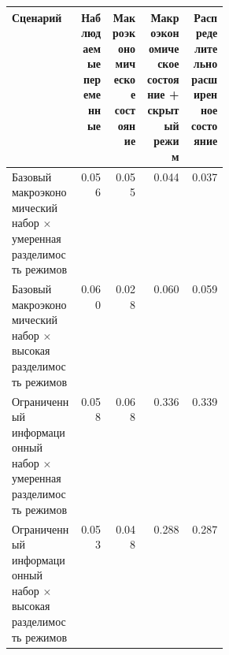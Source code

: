 \begin{tabular}{p{0.32\linewidth}rrrr}
\toprule
Сценарий & Наблюдаемые переменные & Макроэкономическое состояние & Макроэкономическое состояние + скрытый режим & Распределительно расширенное состояние \\
\midrule
Базовый макроэкономический набор × умеренная разделимость режимов & 0.056 & 0.055 & 0.044 & 0.037 \\
Базовый макроэкономический набор × высокая разделимость режимов & 0.060 & 0.028 & 0.060 & 0.059 \\
Ограниченный информационный набор × умеренная разделимость режимов & 0.058 & 0.068 & 0.336 & 0.339 \\
Ограниченный информационный набор × высокая разделимость режимов & 0.053 & 0.048 & 0.288 & 0.287 \\
\bottomrule
\end{tabular}